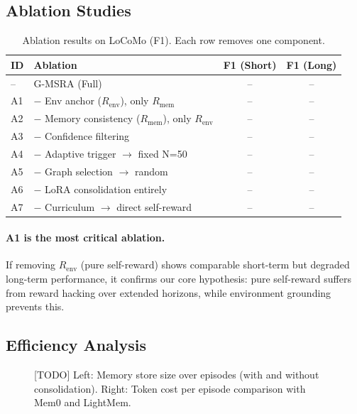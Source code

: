 \documentclass{article}
\newcommand{\gmsra}{\textsc{G-MSRA}}
\newcommand{\renv}{R_{\mathrm{env}}}
\newcommand{\rmem}{R_{\mathrm{mem}}}
\begin{document}
\subsection{Ablation Studies}

\begin{table}[h]
\centering
\small
\caption{Ablation results on LoCoMo (F1). Each row removes one component.}
\label{tab:ablation}
\begin{tabular}{llcc}
\toprule
\textbf{ID} & \textbf{Ablation} & \textbf{F1 (Short)} & \textbf{F1 (Long)} \\
\midrule
-- & \gmsra{} (Full) & -- & -- \\
A1 & $-$ Env anchor ($\renv$), only $\rmem$ & -- & -- \\
A2 & $-$ Memory consistency ($\rmem$), only $\renv$ & -- & -- \\
A3 & $-$ Confidence filtering & -- & -- \\
A4 & $-$ Adaptive trigger $\to$ fixed N=50 & -- & -- \\
A5 & $-$ Graph selection $\to$ random & -- & -- \\
A6 & $-$ LoRA consolidation entirely & -- & -- \\
A7 & $-$ Curriculum $\to$ direct self-reward & -- & -- \\
\bottomrule
\end{tabular}
\end{table}

\paragraph{A1 is the most critical ablation.} If removing $\renv$ (pure self-reward) shows comparable short-term but degraded long-term performance, it confirms our core hypothesis: pure self-reward suffers from reward hacking over extended horizons, while environment grounding prevents this.

\subsection{Efficiency Analysis}

\begin{figure}[h]
\centering
\caption{[TODO] Left: Memory store size over episodes (with and without consolidation). Right: Token cost per episode comparison with Mem0 and LightMem.}
\label{fig:efficiency}
\end{figure}
\end{document}
